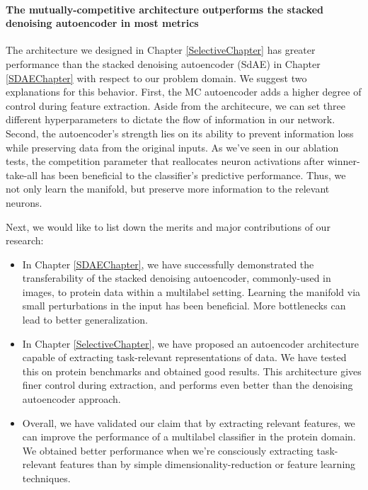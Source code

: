 \paragraph{The mutually-competitive architecture outperforms the stacked
denoising autoencoder in most metrics} The architecture we designed in Chapter
\ref{SelectiveChapter} has greater performance than the stacked denoising
autoencoder (SdAE) in Chapter \ref{SDAEChapter} with respect to our problem
domain. We suggest two explanations for this behavior. First, the MC
autoencoder adds a higher degree of control during feature extraction. Aside
from the architecure, we can set three different hyperparameters to dictate the
flow of information in our network. Second, the autoencoder's strength lies on
its ability to prevent information loss while preserving data from the original
inputs. As we've seen in our ablation tests, the competition parameter that
reallocates neuron activations after winner-take-all has been beneficial to the
classifier's predictive performance. Thus, we not only learn the manifold, but
preserve more information to the relevant neurons.

\newpage
\par Next, we would like to list down the merits and major contributions of our
research:
\begin{itemize}
    \item In Chapter \ref{SDAEChapter}, we have successfully demonstrated the
        transferability of the stacked denoising autoencoder, commonly-used in
        images, to protein data within a multilabel setting. Learning the
        manifold via small perturbations in the input has been beneficial. More
        bottlenecks can lead to better generalization.
    \item In Chapter \ref{SelectiveChapter}, we have proposed an autoencoder
        architecture capable of extracting task-relevant representations of
        data. We have tested this on protein benchmarks and obtained good
        results. This architecture gives finer control during extraction, and
        performs even better than the denoising autoencoder approach.
    \item Overall, we have validated our claim that by extracting relevant
        features, we can improve the performance of a multilabel classifier in
        the protein domain. We obtained better performance when we're
        consciously extracting task-relevant features than by simple
        dimensionality-reduction or feature learning techniques.
\end{itemize}

